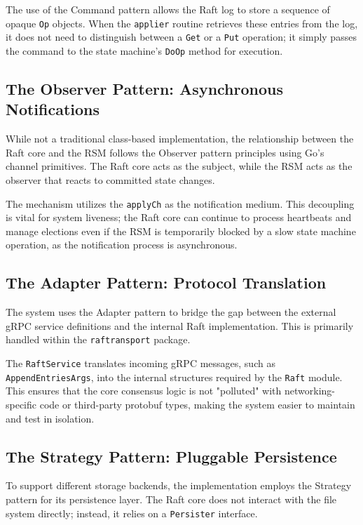 The use of the Command pattern allows the Raft log to store a sequence of opaque \texttt{Op} objects. When the \texttt{applier} routine retrieves these entries from the log, it does not need to distinguish between a \texttt{Get} or a \texttt{Put} operation; it simply passes the command to the state machine's \texttt{DoOp} method for execution.

\subsection{The Observer Pattern: Asynchronous Notifications}
While not a traditional class-based implementation, the relationship between the Raft core and the RSM follows the Observer pattern principles using Go's channel primitives. The Raft core acts as the subject, while the RSM acts as the observer that reacts to committed state changes.

The mechanism utilizes the \texttt{applyCh} as the notification medium. This decoupling is vital for system liveness; the Raft core can continue to process heartbeats and manage elections even if the RSM is temporarily blocked by a slow state machine operation, as the notification process is asynchronous.

\subsection{The Adapter Pattern: Protocol Translation}
The system uses the Adapter pattern to bridge the gap between the external gRPC service definitions and the internal Raft implementation. This is primarily handled within the \texttt{raftransport} package.

The \texttt{RaftService} translates incoming gRPC messages, such as \texttt{AppendEntriesArgs}, into the internal structures required by the \texttt{Raft} module. This ensures that the core consensus logic is not "polluted" with networking-specific code or third-party protobuf types, making the system easier to maintain and test in isolation.

\subsection{The Strategy Pattern: Pluggable Persistence}
To support different storage backends, the implementation employs the Strategy pattern for its persistence layer.
The Raft core does not interact with the file system directly; instead, it relies on a \texttt{Persister} interface.

